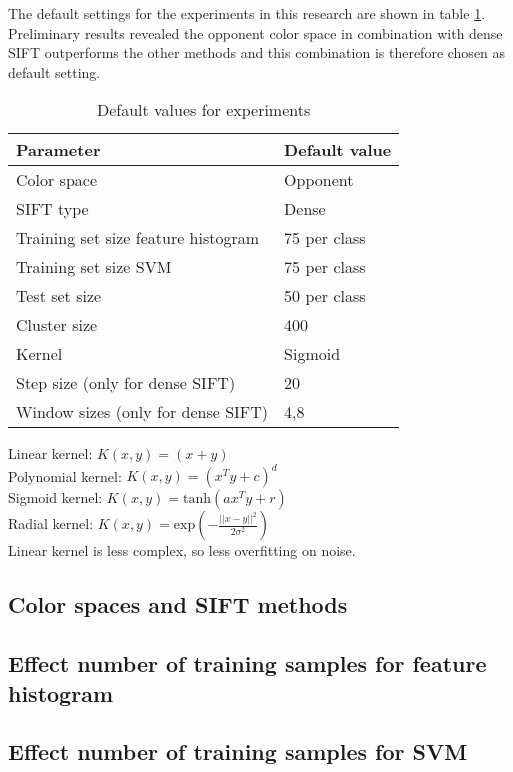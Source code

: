 The default settings for the experiments in this research are shown in table \ref{tab:default}. Preliminary results revealed the opponent color space in combination with dense SIFT outperforms the other methods and this combination is therefore chosen as default setting.

\begin{table}[H]
\begin{tabular}{|l|l|}
\hline
\textbf{Parameter} & \textbf{Default value}\\
\hline
Color space & Opponent\\
SIFT type & Dense\\
Training set size feature histogram & 75 per class\\
Training set size SVM & 75 per class\\
Test set size & 50 per class \\
Cluster size & 400 \\
Kernel & Sigmoid \\
Step size (only for dense SIFT) & 20\\
Window sizes (only for dense SIFT) & 4,8\\
\hline
\end{tabular}
\caption{Default values for experiments}
\label{tab:default}
\end{table}
Linear kernel: $K(x,y) = (x+y)$\\
Polynomial kernel: $K(x,y) = (x^Ty + c)^d$\\
Sigmoid kernel: $K(x,y) = \text{tanh}(ax^Ty + r)$\\
Radial kernel: $K(x,y) = \text{exp}(-\frac{||x-y||^2}{2\sigma^2})$\\

Linear kernel is less complex, so less overfitting on noise. 

\subsection{Color spaces and SIFT methods}


\subsection{Effect number of training samples for feature histogram}


\subsection{Effect number of training samples for SVM}




